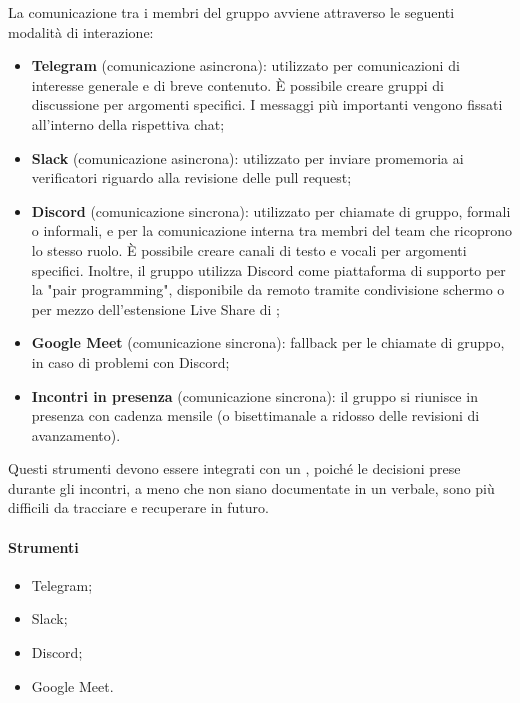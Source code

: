 \par La comunicazione tra i membri del gruppo avviene attraverso le seguenti modalità di interazione:
\begin{itemize}
  \item \textbf{Telegram} (comunicazione asincrona): utilizzato per comunicazioni di interesse generale e di breve contenuto. È possibile creare gruppi di discussione per argomenti specifici. I messaggi più importanti vengono fissati all'interno della rispettiva chat;
  \item \textbf{Slack} (comunicazione asincrona): utilizzato per inviare promemoria ai verificatori riguardo alla revisione delle pull request;
  \item \textbf{Discord} (comunicazione sincrona): utilizzato per chiamate di gruppo, formali o informali, e per la comunicazione interna tra membri del team che ricoprono lo stesso ruolo. È possibile creare canali di testo e vocali per argomenti specifici. Inoltre, il gruppo utilizza Discord come piattaforma di supporto per la "pair programming", disponibile da remoto tramite condivisione schermo o per mezzo dell'estensione Live Share di ;
  \item \textbf{Google Meet} (comunicazione sincrona): fallback per le chiamate di gruppo, in caso di problemi con Discord;
  \item \textbf{Incontri in presenza} (comunicazione sincrona): il gruppo si riunisce in presenza con cadenza mensile (o bisettimanale a ridosso delle revisioni di avanzamento).
\end{itemize}

\vspace{0.5\baselineskip}
\par Questi strumenti devono essere integrati con un , poiché le decisioni prese durante gli incontri, a meno che non siano documentate in un verbale, sono più difficili da tracciare e recuperare in futuro.

\paragraph*{Strumenti}
\IntroStrumenti
\begin{itemize}
  \item Telegram;
  \item Slack;
  \item Discord;
  \item Google Meet.
\end{itemize}

